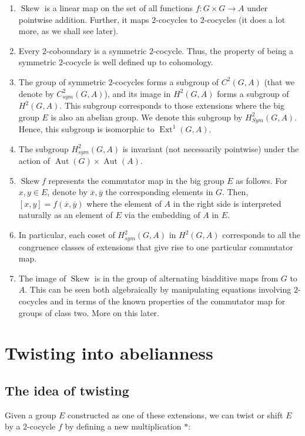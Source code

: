 \documentclass[10pt]{amsart}
\newcommand{\Skew}{\operatorname{Skew}}
\newcommand{\Aut}{\operatorname{Aut}}
\newcommand{\Ext}{\operatorname{Ext}}
\begin{document}
\begin{enumerate}
  \begin{enumerate}
  \item $\Skew$ is a linear map on the set of all functions $f:G
    \times G \to A$ under pointwise addition. Further, it maps
    $2$-cocycles to $2$-cocycles (it does a lot more, as we shall see
    later).
  \item Every $2$-coboundary is a symmetric $2$-cocycle. Thus, the
    property of being a symmetric $2$-cocycle is well defined up to
    cohomology.
  \item The group of symmetric $2$-cocycles forms a subgroup of
    $C^2(G,A)$ (that we denote by $C^2_{sym}(G,A)$), and its image in
    $H^2(G,A)$ forms a subgroup of $H^2(G,A)$. This subgroup
    corresponds to those extensions where the big group $E$ is also an
    abelian group. We denote this subgroup by $H^2_{Sym}(G,A)$. Hence,
    this subgroup is isomorphic to $\Ext^1(G,A)$.
  \item The subgroup $H^2_{sym}(G,A)$ is invariant (not necessarily
    pointwise) under the action of $\Aut(G) \times \Aut(A)$.
  \item $\Skew f$ represents the commutator map in the big group $E$
    as follows. For $x,y \in E$, denote by $\overline{x},
    \overline{y}$ the corresponding elements in $G$. Then, $[x,y] =
    f(\overline{x},\overline{y})$ where the element of $A$ in the
    right side is interpreted naturally as an element of $E$ via the
    embedding of $A$ in $E$.
  \item In particular, each coset of $H^2_{sym}(G,A)$ in $H^2(G,A)$
    corresponds to all the congruence classes of extensions that give
    rise to one particular commutator map.
  \item The image of $\Skew$ is in the group of alternating biadditive
    maps from $G$ to $A$. This can be seen both algebraically by
    manipulating equations involving $2$-cocycles and in terms of the
    known properties of the commutator map for groups of class
    two. More on this later.
  \end{enumerate}
\end{enumerate}

\section{Twisting into abelianness}

\subsection{The idea of twisting}
Given a group $E$ constructed as one of these extensions, we can twist
or shift $E$ by a $2$-cocycle $f$ by defining a new multiplication
$*$:
\end{document}
